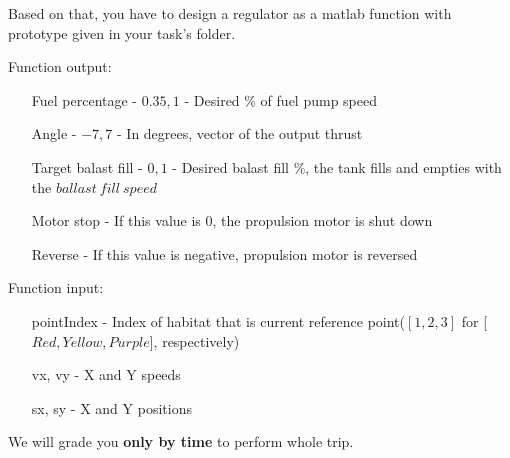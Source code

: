 \documentclass[openany]{book}
\begin{document}
Based on that, you have to design a regulator as a matlab function with prototype given in your task's folder.

Function output:

\begin{itemize}
	\item[Fuel percentage] - ${0.35,1}$ - Desired \% of fuel pump speed
	\item[Angle] - ${-7,7}$ - In degrees, vector of the output thrust
	\item[Target balast fill] - ${0,1}$ - Desired balast fill \%, the tank fills and empties with the $ballast\ fill\ speed$
	\item[Motor stop] - If this value is 0, the propulsion motor is shut down
	\item[Reverse] - If this value is negative, propulsion motor is reversed
\end{itemize}

Function input:

\begin{itemize}
	\item[pointIndex] - Index of habitat that is current reference point($[1, 2, 3]$ for [$Red, Yellow, Purple$], respectively)
	\item[vx, vy] - X and Y speeds
	\item[sx, sy] - X and Y positions
\end{itemize}


We will grade you \textbf{only by time} to perform whole trip.
	
	
	
\end{document}
